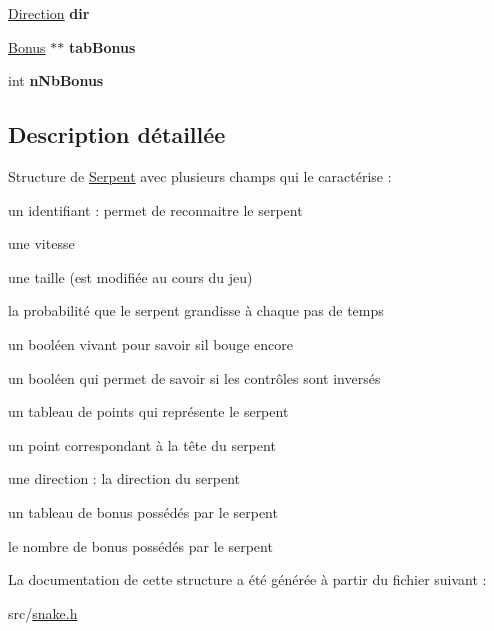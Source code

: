 \begin{DoxyCompactItemize}
\item 
\hyperlink{snake_8h_a224b9163917ac32fc95a60d8c1eec3aa}{Direction} {\bfseries dir}\hypertarget{struct_serpent_a58d94fa8f7ddf189cd6eabdea4f2346c}{}\label{struct_serpent_a58d94fa8f7ddf189cd6eabdea4f2346c}

\item 
\hyperlink{struct_bonus}{Bonus} $\ast$$\ast$ {\bfseries tab\+Bonus}\hypertarget{struct_serpent_a5caf2f6b95504582543aadf9250a9f1f}{}\label{struct_serpent_a5caf2f6b95504582543aadf9250a9f1f}

\item 
int {\bfseries n\+Nb\+Bonus}\hypertarget{struct_serpent_a8ac28cdfb3bb7a7409393a3e62d83897}{}\label{struct_serpent_a8ac28cdfb3bb7a7409393a3e62d83897}

\end{DoxyCompactItemize}


\subsection{Description détaillée}
Structure de \hyperlink{struct_serpent}{Serpent} avec plusieurs champs qui le caractérise \+:
\begin{DoxyItemize}
\item un identifiant \+: permet de reconnaitre le serpent
\item une vitesse
\item une taille (est modifiée au cours du jeu)
\item la probabilité que le serpent grandisse à chaque pas de temps
\item un booléen vivant pour savoir s\textquotesingle{}il bouge encore
\item un booléen qui permet de savoir si les contrôles sont inversés
\item un tableau de points qui représente le serpent
\item un point correspondant à la tête du serpent
\item une direction \+: la direction du serpent
\item un tableau de bonus possédés par le serpent
\item le nombre de bonus possédés par le serpent 
\end{DoxyItemize}

La documentation de cette structure a été générée à partir du fichier suivant \+:\begin{DoxyCompactItemize}
\item 
src/\hyperlink{snake_8h}{snake.\+h}\end{DoxyCompactItemize}
